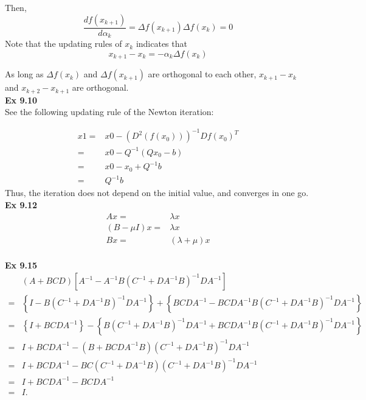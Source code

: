 \documentclass[letterpaper,12pt]{article}
\theoremstyle{definition}
\begin{document}
Then,
\[\frac{d f(x_{k+1}) }{d \alpha_k}  = \Delta f(x_{k+1}) \Delta f(x_k) = 0 \]
Note that the updating rules of $x_k$ indicates that
\[x_{k+1} - x_k = -\alpha_k \Delta f(x_k)\]

As long as $\Delta f(x_k)$ and $\Delta f(x_{k+1})$ are orthogonal to each other, $x_{k+1} - x_k$ and $x_{k+2} - x_{k+1}$ are orthogonal. \\

\textbf{Ex 9.10}\\
See the following updating rule of the Newton iteration:

\begin{align*}
   x1=& x0 - (D^2 (f(x_0)))^{-1} Df(x_0)^T \\
     =& x0 - Q^{-1} (Qx_0 - b) \\
     =& x0 - x_0 + Q^{-1} b \\
     =& Q^{-1} b
\end{align*}
Thus, the iteration does not depend on the initial value, and converges in one go.\\

\textbf{Ex 9.12}\\

\begin{align*}
  Ax =&\lambda x  \\
  (B - \mu I)x =& \lambda x  \\
   Bx =& (\lambda + \mu)x  \\
\end{align*}

\textbf{Ex 9.15}\\
\begin{align*}
& \left(A+BCD \right) \left[ A^{-1} - A^{-1}B \left(C^{-1}+DA^{-1}B \right)^{-1} DA^{-1} \right] \\
= {} & \left \{ I - B\left(C^{-1}+DA^{-1}B \right)^{-1}DA^{-1} \right \} +  \left \{ BCDA^{-1} - BCDA^{-1}B \left(C^{-1}+DA^{-1}B \right)^{-1} DA^{-1}  \right \} \\
= {} & \left \{  I + BCDA^{-1} \right \} - \left \{ B\left(C^{-1}+DA^{-1}B \right)^{-1}DA^{-1} + BCDA^{-1}B \left(C^{-1}+DA^{-1}B \right)^{-1} DA^{-1} \right \} \\
= {} & I + BCDA^{-1} - \left  (B+BCDA^{-1}B \right ) \left (C^{-1} + DA^{-1}B \right )^{-1}DA^{-1} \\
= {} & I + BCDA^{-1} - BC \left (C^{-1}+ DA^{-1}B \right ) \left (C^{-1} + DA^{-1}B \right )^{-1}DA^{-1} \\
= {} & I + BCDA^{-1} - BCDA^{-1} \\
= {} & I.
\end{align*}
\end{document}
